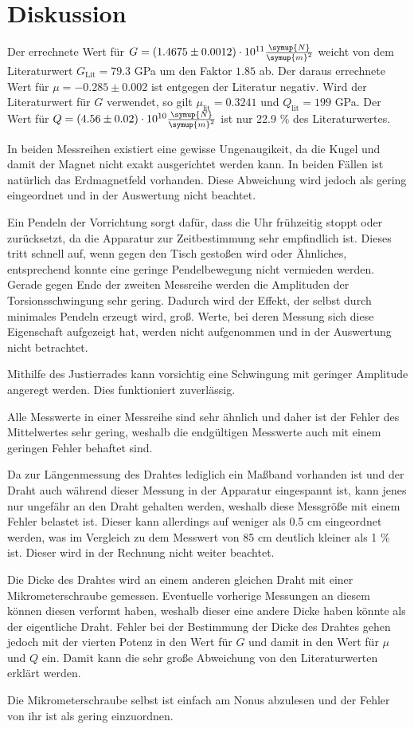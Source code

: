 \section{Diskussion}
\label{sec:Diskussion}

Der errechnete Wert für $G = (1.4675 \pm 0.0012) \cdot 10^{11} \frac{\symup{N}}{\symup{m}^2}$ weicht von dem Literaturwert $G_\text{Lit} = 79.3$ GPa \cite{G-stahl} um den Faktor $1.85$ ab.
Der daraus errechnete Wert für $\mu = -0.285 \pm 0.002$ ist entgegen der Literatur negativ.
Wird der Literaturwert für $G$ verwendet, so gilt $\mu_\text{lit} = 0.3241$ und $Q_\text{lit} = 199$ GPa.
Der Wert für $Q = (4.56 \pm 0.02) \cdot 10^{10} \frac{\symup{N}}{\symup{m}^2}$ ist nur 22.9 \% des Literaturwertes.

In beiden Messreihen existiert eine gewisse Ungenaugikeit, da die Kugel und damit der Magnet nicht exakt ausgerichtet werden kann.
In beiden Fällen ist natürlich das Erdmagnetfeld vorhanden. Diese Abweichung wird jedoch als gering eingeordnet und in der Auswertung nicht beachtet.

Ein Pendeln der Vorrichtung sorgt dafür, dass die Uhr frühzeitig stoppt oder zurücksetzt, da die Apparatur zur Zeitbestimmung sehr empfindlich ist. Dieses tritt schnell auf, wenn gegen den Tisch gestoßen wird oder Ähnliches, entsprechend konnte eine geringe Pendelbewegung nicht vermieden werden.
Gerade gegen Ende der zweiten Messreihe werden die Amplituden der Torsionsschwingung sehr gering. Dadurch wird der Effekt, der selbst durch minimales Pendeln erzeugt wird, groß.
Werte, bei deren Messung sich diese Eigenschaft aufgezeigt hat, werden nicht aufgenommen und in der Auswertung nicht betrachtet.

Mithilfe des Justierrades kann vorsichtig eine Schwingung mit geringer Amplitude angeregt werden. Dies funktioniert zuverlässig.

Alle Messwerte in einer Messreihe sind sehr ähnlich und daher ist der Fehler des Mittelwertes sehr gering, weshalb die endgültigen Messwerte auch mit einem geringen Fehler behaftet sind.

Da zur Längenmessung des Drahtes lediglich ein Maßband vorhanden ist und der Draht auch während dieser Messung in der Apparatur eingespannt ist, kann jenes nur ungefähr an den Draht gehalten werden, weshalb diese Messgröße mit einem Fehler belastet ist.
Dieser kann allerdings auf weniger als 0.5 cm eingeordnet werden, was im Vergleich zu dem Messwert von 85 cm deutlich kleiner als 1 \% ist. Dieser wird in der Rechnung nicht weiter beachtet.

Die Dicke des Drahtes wird an einem anderen gleichen Draht mit einer Mikrometerschraube gemessen. 
Eventuelle vorherige Messungen an diesem können diesen verformt haben, weshalb dieser eine andere Dicke haben könnte als der eigentliche Draht.
Fehler bei der Bestimmung der Dicke des Drahtes gehen jedoch mit der vierten Potenz in den Wert für $G$ und damit in den Wert für $\mu$ und $Q$ ein.
Damit kann die sehr große Abweichung von den Literaturwerten erklärt werden.

Die Mikrometerschraube selbst ist einfach am Nonus abzulesen und der Fehler von ihr ist als gering einzuordnen.
